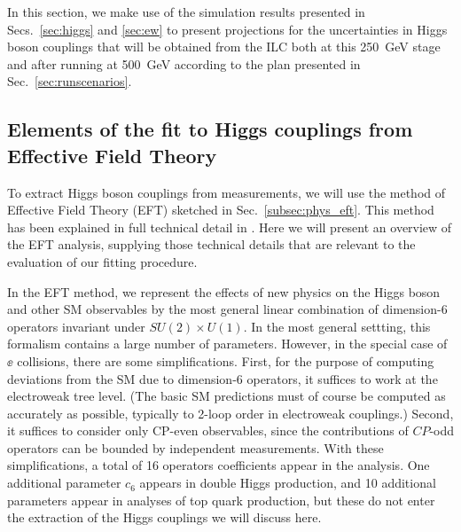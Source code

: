 In this section, we make use of the simulation results presented in
Secs.~\ref{sec:higgs} and \ref{sec:ew} to present projections for the
uncertainties in Higgs boson couplings that will be obtained from the
ILC both at this 250~GeV stage and after running at 500~GeV according
to the plan presented in Sec.~\ref{sec:runscenarios}.   


\subsection{Elements of the fit to Higgs couplings from Effective Field Theory}
\label{subsec:global:elements}
 


To extract
Higgs boson couplings from measurements, we will use the method of
Effective Field Theory (EFT) sketched in Sec.~\ref{subsec:phys_eft}.
This method has been explained in full technical  detail in
\cite{Barklow:2017suo,Barklow:2017awn}.
Here we will present an overview of the EFT analysis, supplying those 
technical details that are relevant to the evaluation of our fitting procedure.

In the EFT method, we represent the effects of new physics on the
Higgs boson and other SM observables by the most general linear
combination of dimension-6 operators invariant under $SU(2)\times
U(1)$.  In the most general settting, this formalism contains a large
number of parameters.  However, in the special case of $\ee$
collisions, there are some simplifications.   First, for the purpose
of computing deviations from the SM due to dimension-6 operators, it
suffices to work at the electroweak tree level.   (The basic SM
predictions must of course be computed as accurately as possible,
typically to 2-loop order in electroweak couplings.)  Second, it
suffices to consider only CP-even observables, since the 
 contributions of $CP$-odd operators can be bounded
 by independent measurements.   With these simplifications, a total of
 16 operators coefficients appear in the analysis.  One additional
 parameter $c_6$ appears in double Higgs production, and 10 additional
 parameters appear in analyses of top quark production, but these do
 not enter the extraction of the Higgs couplings we will discuss here.

